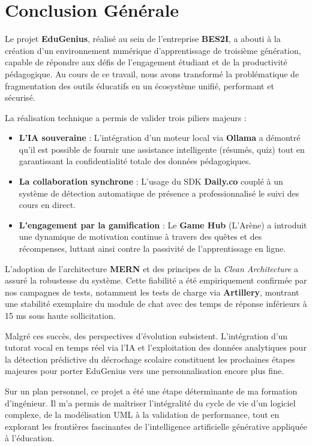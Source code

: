 \chapter*{Conclusion Générale}
{}

Le projet \textbf{EduGenius}, réalisé au sein de l'entreprise \textbf{BES2I}, a abouti à la création d'un environnement numérique d'apprentissage de troisième génération, capable de répondre aux défis de l'engagement étudiant et de la productivité pédagogique. Au cours de ce travail, nous avons transformé la problématique de fragmentation des outils éducatifs en un écosystème unifié, performant et sécurisé.

La réalisation technique a permis de valider trois piliers majeurs :
\begin{itemize}
    \item \textbf{L'IA souveraine} : L'intégration d'un moteur local via \textbf{Ollama} a démontré qu'il est possible de fournir une assistance intelligente (résumés, quiz) tout en garantissant la confidentialité totale des données pédagogiques.
    \item \textbf{La collaboration synchrone} : L'usage du SDK \textbf{Daily.co} couplé à un système de détection automatique de présence a professionnalisé le suivi des cours en direct.
    \item \textbf{L'engagement par la gamification} : Le \textbf{Game Hub} (L'Arène) a introduit une dynamique de motivation continue à travers des quêtes et des récompenses, luttant ainsi contre la passivité de l'apprentissage en ligne.
\end{itemize}

L'adoption de l'architecture \textbf{MERN} et des principes de la \textit{Clean Architecture} a assuré la robustesse du système. Cette fiabilité a été empiriquement confirmée par nos campagnes de tests, notamment les tests de charge via \textbf{Artillery}, montrant une stabilité exemplaire du module de chat avec des temps de réponse inférieurs à 15 ms sous haute sollicitation.

Malgré ces succès, des perspectives d'évolution subsistent. L'intégration d'un tutorat vocal en temps réel via l'IA et l'exploitation des données analytiques pour la détection prédictive du décrochage scolaire constituent les prochaines étapes majeures pour porter EduGenius vers une personnalisation encore plus fine.

Sur un plan personnel, ce projet a été une étape déterminante de ma formation d'ingénieur. Il m'a permis de maîtriser l'intégralité du cycle de vie d'un logiciel complexe, de la modélisation UML à la validation de performance, tout en explorant les frontières fascinantes de l'intelligence artificielle générative appliquée à l'éducation.
